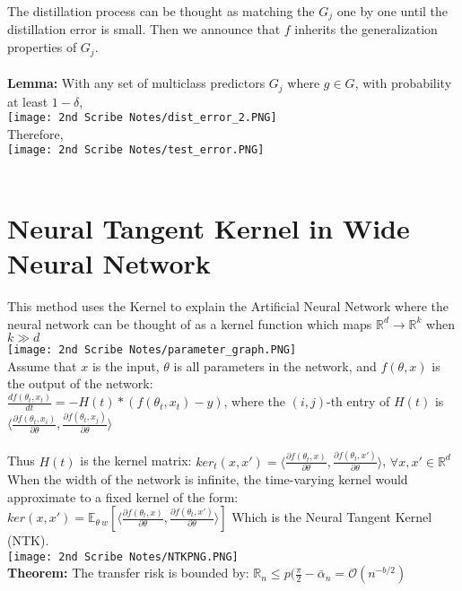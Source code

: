 \documentclass[12pt]{article}
\begin{document}
        The distillation process can be thought as matching the $G_j$ one by one until the distillation error is small. Then we announce that $f$ inherits the generalization properties of $G_j$. \\
        \\
        \textbf{Lemma:} With any set of multiclass predictors $G_j$ where $g\in G$, with probability at least $1-\delta$, \\
        \texttt{[image: 2nd Scribe Notes/dist\_error\_2.PNG]} \\
        Therefore, \\
        \texttt{[image: 2nd Scribe Notes/test\_error.PNG]} \\
        \\
        \section{Neural Tangent Kernel in Wide Neural Network}
        This method uses the Kernel to explain the Artificial Neural Network where the neural network can be thought of as a kernel function which maps $\mathbb{R}^d \rightarrow \mathbb{R}^k$ when $k\gg d$ \\
        \texttt{[image: 2nd Scribe Notes/parameter\_graph.PNG]} \\
        Assume that $x$ is the input, $\theta$ is all parameters in the network, and $f(\theta, x)$ is the output of the network: \\
        $\frac{df(\theta_t, x_t)}{dt}=-H(t)*(f(\theta_t, x_t)-y)$, where the $(i, j)$-th entry of $H(t)$ is $\langle \frac{\partial f(\theta_t, x_i)}{\partial \theta}, \frac{\partial f(\theta_t, x_j)}{\partial \theta}\rangle$ \\
        \\
        Thus $H(t)$ is the kernel matrix: $ker_t(x, x')=\langle \frac{\partial f(\theta_t, x)}{\partial \theta}, \frac{\partial f(\theta_t, x')}{\partial \theta}\rangle$, $\forall x, x' \in \mathbb{R}^d$ \\
        When the width of the network is infinite, the time-varying kernel would approximate to a fixed kernel of the form: $ker(x, x')=\mathbb{E}_{\theta~w}[\langle \frac{\partial f(\theta_t, x)}{\partial \theta}, \frac{\partial f(\theta_t, x')}{\partial \theta}\rangle]$ Which is the Neural Tangent Kernel (NTK). \\
        \texttt{[image: 2nd Scribe Notes/NTKPNG.PNG]} \\
        \textbf{Theorem:} The transfer risk is bounded by: $\mathbb{R}_n\le p(\frac{\pi}{2}-\bar{\alpha}_n=\mathcal{O}(n^{-b/2})$ \\
        \\
\end{document}
